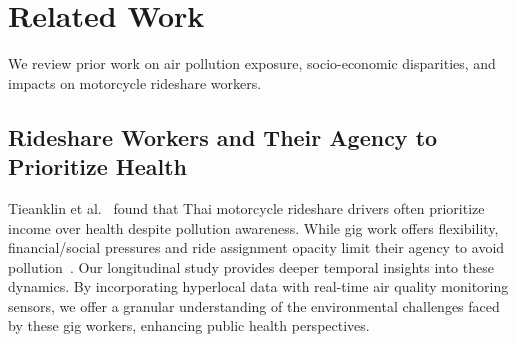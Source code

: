\section{Related Work}
We review prior work on air pollution exposure, socio-economic disparities, and impacts on motorcycle rideshare workers.


\subsection{Rideshare Workers and Their Agency to Prioritize Health}


Tieanklin et al.~\cite{tieanklin2024rideshare} found that Thai motorcycle rideshare drivers often prioritize income over health despite pollution awareness.
While gig work offers flexibility, financial/social pressures and ride assignment opacity limit their agency to avoid pollution~\cite{machado2021midlife,elfassy2019associations}.
Our longitudinal study provides deeper temporal insights into these dynamics.
By incorporating hyperlocal data with real-time air quality monitoring sensors, we offer a granular understanding of the environmental challenges faced by these gig workers, enhancing public health perspectives.


